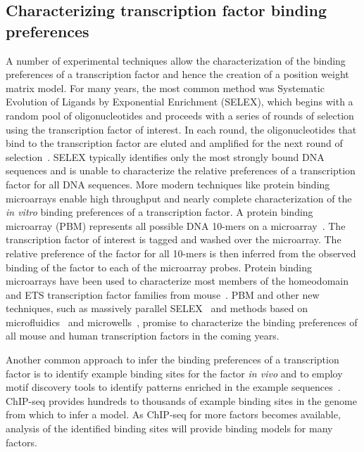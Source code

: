 \subsection{Characterizing transcription factor binding preferences}
A number of experimental techniques allow the characterization of the binding preferences of a transcription factor
and hence the creation of a position weight matrix model.  For many years, the most common method was Systematic Evolution of
Ligands by Exponential Enrichment (SELEX), which begins with a random pool of oligonucleotides and proceeds with a
series of rounds of selection using the transcription factor of interest.  In each round, the oligonucleotides that bind
to the transcription factor are eluted and amplified for the next round of selection~\citep{Djordjevic2007}.  SELEX typically identifies only
the most strongly bound DNA sequences and is unable to characterize the relative preferences of a transcription factor
for all DNA sequences.  More modern techniques like protein binding microarrays enable high throughput and nearly complete
characterization of the \textit{in vitro} binding preferences of a transcription factor.  A protein binding microarray (PBM)
represents all possible DNA 10-mers on a microarray~\citep{Berger2006}.  The transcription factor of interest is tagged and washed over the
microarray.  The relative preference of the factor for all 10-mers is then inferred from the observed binding of the factor to each
of the microarray probes.  Protein binding microarrays have been used to characterize most members of the homeodomain and ETS
transcription factor families from mouse~\citep{Berger2008,Wei2010}.  PBM and other new techniques, such as massively parallel
SELEX~\citep{Jolma2010} and methods based on microfluidics~\citep{Fordyce2010} and microwells~\citep{Hallikas2006}, promise to
characterize the binding preferences of all mouse and human transcription factors in the coming years.
%

Another common approach to infer the binding preferences of a transcription factor is to identify example binding sites
for the factor \textit{in vivo} and to employ motif discovery tools to identify patterns enriched in the example
sequences~\citep{Bailey2006,Tompa2005}.
ChIP-seq provides hundreds to thousands of example binding sites in the genome from which to infer a model.  As ChIP-seq for
more factors becomes available, analysis of the identified binding sites will provide binding models for many factors.
%

